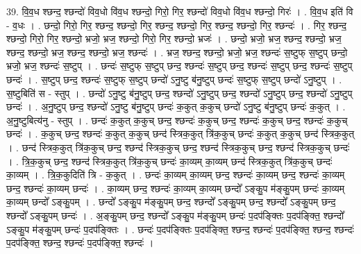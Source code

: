 \documentclass[17pt]{extarticle}
\begin{document}
39. वि॒व॒ध श्छन्द॒ श्छन्दो॑ विव॒धो वि॑व॒ध श्छन्दो॒ गिरो॒ गिर॒ श्छन्दो॑ विव॒धो वि॑व॒ध श्छन्दो॒ गिरः॑ । . वि॒व॒ध इति॑ वि - व॒धः । . छन्दो॒ गिरो॒ गिर॒ श्छन्द॒ श्छन्दो॒ गिर॒ श्छन्द॒ श्छन्दो॒ गिर॒ श्छन्द॒ श्छन्दो॒ गिर॒ श्छन्दः॑ । . गिर॒ श्छन्द॒ श्छन्दो॒ गिरो॒ गिर॒ श्छन्दो॒ भ्रजो॒ भ्रज॒ श्छन्दो॒ गिरो॒ गिर॒ श्छन्दो॒ भ्रजः॑ । . छन्दो॒ भ्रजो॒ भ्रज॒ श्छन्द॒ श्छन्दो॒ भ्रज॒ श्छन्द॒ श्छन्दो॒ भ्रज॒ श्छन्द॒ श्छन्दो॒ भ्रज॒ श्छन्दः॑ । . भ्रज॒ श्छन्द॒ श्छन्दो॒ भ्रजो॒ भ्रज॒ श्छन्दः॑ स॒ष्टुफ् स॒ष्टुप् छन्दो॒ भ्रजो॒ भ्रज॒ श्छन्दः॑ स॒ष्टुप् । . छन्दः॑ स॒ष्टुफ् स॒ष्टुप् छन्द॒ श्छन्दः॑ स॒ष्टुप् छन्द॒ श्छन्दः॑ स॒ष्टुप् छन्द॒ श्छन्दः॑ स॒ष्टुप् छन्दः॑ । . स॒ष्टुप् छन्द॒ श्छन्दः॑ स॒ष्टुफ् स॒ष्टुप् छन्दो॑ ऽनु॒ष्टु ब॑नु॒ष्टुप् छन्दः॑ स॒ष्टुफ् स॒ष्टुप् छन्दो॑ ऽनु॒ष्टुप् । . स॒ष्टुबिति॑ स - स्तुप् । . छन्दो॑ ऽनु॒ष्टु ब॑नु॒ष्टुप् छन्द॒ श्छन्दो॑ ऽनु॒ष्टुप् छन्द॒ श्छन्दो॑ ऽनु॒ष्टुप् छन्द॒ श्छन्दो॑ ऽनु॒ष्टुप् छन्दः॑ । . अ॒नु॒ष्टुप् छन्द॒ श्छन्दो॑ ऽनु॒ष्टु ब॑नु॒ष्टुप् छन्दः॑ क॒कुत् क॒कुच् छन्दो॑ ऽनु॒ष्टु ब॑नु॒ष्टुप् छन्दः॑ क॒कुत् । . अ॒नु॒ष्टुबित्य॑नु - स्तुप् । . छन्दः॑ क॒कुत् क॒कुच् छन्द॒ श्छन्दः॑ क॒कुच् छन्द॒ श्छन्दः॑ क॒कुच् छन्द॒ श्छन्दः॑ क॒कुच् छन्दः॑ । . क॒कुच् छन्द॒ श्छन्दः॑ क॒कुत् क॒कुच् छन्द॑ स्त्रिक॒कुत् त्रि॑क॒कुच् छन्दः॑ क॒कुत् क॒कुच् छन्द॑ स्त्रिक॒कुत् । . छन्द॑ स्त्रिक॒कुत् त्रि॑क॒कुच् छन्द॒ श्छन्द॑ स्त्रिक॒कुच् छन्द॒ श्छन्द॑ स्त्रिक॒कुच् छन्द॒ श्छन्द॑ स्त्रिक॒कुच् छन्दः॑ । . त्रि॒क॒कुच् छन्द॒ श्छन्द॑ स्त्रिक॒कुत् त्रि॑क॒कुच् छन्दः॑ का॒व्यम् का॒व्यम् छन्द॑ स्त्रिक॒कुत् त्रि॑क॒कुच् छन्दः॑ का॒व्यम् । . त्रि॒क॒कुदिति॑ त्रि - क॒कुत् । . छन्दः॑ का॒व्यम् का॒व्यम् छन्द॒ श्छन्दः॑ का॒व्यम् छन्द॒ श्छन्दः॑ का॒व्यम् छन्द॒ श्छन्दः॑ का॒व्यम् छन्दः॑ । . का॒व्यम् छन्द॒ श्छन्दः॑ का॒व्यम् का॒व्यम् छन्दो᳚ ऽङ्कु॒प म॑ङ्कु॒पम् छन्दः॑ का॒व्यम् का॒व्यम् छन्दो᳚ ऽङ्कु॒पम् । . छन्दो᳚ ऽङ्कु॒प म॑ङ्कु॒पम् छन्द॒ श्छन्दो᳚ ऽङ्कु॒पम् छन्द॒ श्छन्दो᳚ ऽङ्कु॒पम् छन्द॒ श्छन्दो᳚ ऽङ्कु॒पम् छन्दः॑ । . अ॒ङ्कु॒पम् छन्द॒ श्छन्दो᳚ ऽङ्कु॒प म॑ङ्कु॒पम् छन्दः॑ प॒दप॑ङ्क्तिः प॒दप॑ङ्क्ति॒ श्छन्दो᳚ ऽङ्कु॒प म॑ङ्कु॒पम् छन्दः॑ प॒दप॑ङ्क्तिः । . छन्दः॑ प॒दप॑ङ्क्तिः प॒दप॑ङ्क्ति॒ श्छन्द॒ श्छन्दः॑ प॒दप॑ङ्क्ति॒ श्छन्द॒ श्छन्दः॑ प॒दप॑ङ्क्ति॒ श्छन्द॒ श्छन्दः॑ प॒दप॑ङ्क्ति॒ श्छन्दः॑ । \newline
\pagebreak
{}
\end{document}
